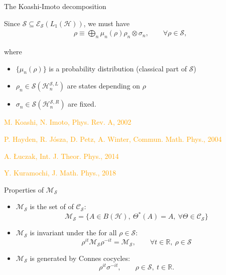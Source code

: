 \documentclass[mathserif]{beamer}
\newcommand{\<}{\langle}
\renewcommand{\>}{\rangle}
\newcommand{\Se}{\mathcal S}
\newcommand{\Ee}{\mathcal E}
\newcommand{\Me}{\mathcal M}
\newcommand{\Ce}{\mathcal C}
\newcommand{\Ha}{\mathcal H}
\begin{document}
\begin{frame}{The Koashi-Imoto decomposition}

Since $\Se\subseteq \Ee_\Se(L_1(\Ha))$, we must have
\begin{align*}
\rho \equiv \bigoplus_n \mu_n(\rho) \rho_n\otimes \sigma_n,\qquad \forall \rho\in \Se, 
\end{align*}

where
\medskip
\begin{itemize}
\item $\{\mu_n(\rho)\} $ is a probability distribution (classical part of $\Se$)
\item  $\rho_n\in \Se(\Ha_n^{\Se,L})$ are states depending on $\rho$
\item $\sigma_n\in \Se(\Ha_n^{\Se,R})$ are fixed.
\end{itemize}

\vfill
{\footnotesize  \textcolor{orange}{M. Koashi, N. Imoto, Phys. Rev. A, 2002}

\textcolor{orange}{P. Hayden, R. J\'osza, D. Petz, A. Winter,  	Commun. Math. Phys., 2004}

\textcolor{orange}{A. \L uczak, Int. J. Theor. Phys., 2014}

\textcolor{orange}{Y. Kuramochi, J. Math. Phys., 2018}
}
\end{frame}



\begin{frame}{Properties of  $\Me_\Se$}


\begin{itemize}
\item $\Me_\Se$ is the set of  of $\Ce_\Se$:
\[
\Me_\Se=\{A\in B(\Ha),\ \Theta^*(A)=A,\ \forall \Theta\in \Ce_\Se\}
\]

\item $\Me_\Se$ is invariant under the  for all $\rho\in \Se$:
\[
\rho^{it}\Me_\Se\rho^{-it}=\Me_\Se,\qquad \forall t\in \mathbb R,\ \rho\in \Se
\]
\item $\Me_\Se$ is generated by Connes cocycles:
\[
\rho^{it}\sigma^{-it}, \qquad \rho\in \Se, \ t\in \mathbb R.
\]
\end{itemize}

\end{frame}
\end{document}

